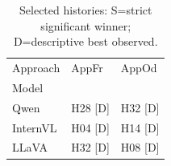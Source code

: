 \begin{table}[tbp]
\caption{Selected histories: S=strict significant winner; D=descriptive best observed.}
\label{tab:rq3-selected-history-matrix}
\begin{tabular}{lll}
\toprule
Approach & AppFr & AppOd \\
Model &  &  \\
\midrule
Qwen & H28 [D] & H32 [D] \\
InternVL & H04 [D] & H14 [D] \\
LLaVA & H32 [D] & H08 [D] \\
\bottomrule
\end{tabular}
\end{table}
